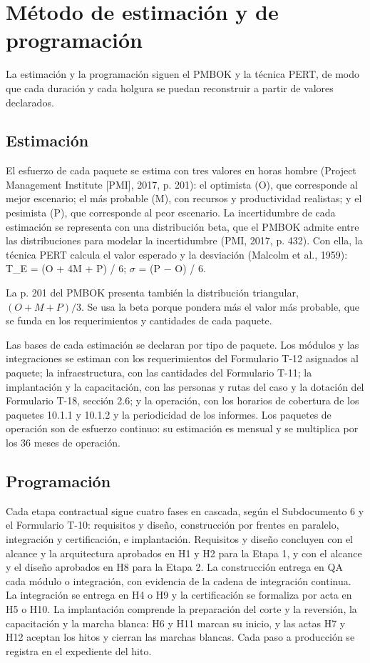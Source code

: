 \section{Método de estimación y de programación}

La estimación y la programación siguen el PMBOK y la técnica PERT, de modo que cada duración y cada holgura se puedan reconstruir a partir de valores declarados.

\subsection{Estimación}

El esfuerzo de cada paquete se estima con tres valores en horas hombre (Project Management Institute [PMI], 2017, p. 201): el optimista (O), que corresponde al mejor escenario; el más probable (M), con recursos y productividad realistas; y el pesimista (P), que corresponde al peor escenario. La incertidumbre de cada estimación se representa con una distribución beta, que el PMBOK admite entre las distribuciones para modelar la incertidumbre (PMI, 2017, p. 432). Con ella, la técnica PERT calcula el valor esperado y la desviación (Malcolm et al., 1959):
T\_E = (O + 4M + P) / 6; \ensuremath{\sigma} = (P − O) / 6.

La p. 201 del PMBOK presenta también la distribución triangular, \((O + M + P)/3\). Se usa la beta porque pondera más el valor más probable, que se funda en los requerimientos y cantidades de cada paquete.

Las bases de cada estimación se declaran por tipo de paquete. Los módulos y las integraciones se estiman con los requerimientos del Formulario T-12 asignados al paquete; la infraestructura, con las cantidades del Formulario T-11; la implantación y la capacitación, con las personas y rutas del caso y la dotación del Formulario T-18, sección 2.6; y la operación, con los horarios de cobertura de los paquetes 10.1.1 y 10.1.2 y la periodicidad de los informes. Los paquetes de operación son de esfuerzo continuo: su estimación es mensual y se multiplica por los 36 meses de operación.

\subsection{Programación}

Cada etapa contractual sigue cuatro fases en cascada, según el Subdocumento 6 y el Formulario T-10: requisitos y diseño, construcción por frentes en paralelo, integración y certificación, e implantación. Requisitos y diseño concluyen con el alcance y la arquitectura aprobados en H1 y H2 para la Etapa 1, y con el alcance y el diseño aprobados en H8 para la Etapa 2. La construcción entrega en QA cada módulo o integración, con evidencia de la cadena de integración continua. La integración se entrega en H4 o H9 y la certificación se formaliza por acta en H5 o H10. La implantación comprende la preparación del corte y la reversión, la capacitación y la marcha blanca: H6 y H11 marcan su inicio, y las actas H7 y H12 aceptan los hitos y cierran las marchas blancas. Cada paso a producción se registra en el expediente del hito.

